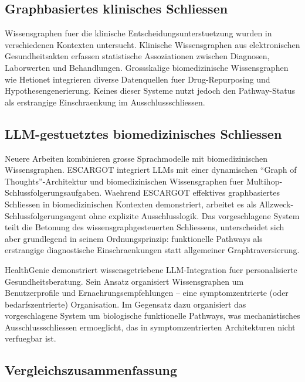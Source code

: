 \documentclass[12pt,a4paper]{article}
\begin{document}
\subsection{Graphbasiertes klinisches Schliessen}

Wissensgraphen fuer die klinische Entscheidungsunterstuetzung wurden in verschiedenen Kontexten untersucht. Klinische Wissensgraphen aus elektronischen Gesundheitsakten \citep{Rotmensch2017} erfassen statistische Assoziationen zwischen Diagnosen, Laborwerten und Behandlungen. Grossskalige biomedizinische Wissensgraphen wie Hetionet \citep{Himmelstein2017} integrieren diverse Datenquellen fuer Drug-Repurposing und Hypothesengenerierung. Keines dieser Systeme nutzt jedoch den Pathway-Status als erstrangige Einschraenkung im Ausschlussschliessen.

\subsection{LLM-gestuetztes biomedizinisches Schliessen}

Neuere Arbeiten kombinieren grosse Sprachmodelle mit biomedizinischen Wissensgraphen. ESCARGOT \citep{Matsumoto2025} integriert LLMs mit einer dynamischen "`Graph of Thoughts"'-Architektur und biomedizinischen Wissensgraphen fuer Multihop-Schlussfolgerungsaufgaben. Waehrend ESCARGOT effektives graphbasiertes Schliessen in biomedizinischen Kontexten demonstriert, arbeitet es als Allzweck-Schlussfolgerungsagent ohne explizite Ausschlusslogik. Das vorgeschlagene System teilt die Betonung des wissensgraphgesteuerten Schliessens, unterscheidet sich aber grundlegend in seinem Ordnungsprinzip: funktionelle Pathways als erstrangige diagnostische Einschraenkungen statt allgemeiner Graphtraversierung.

HealthGenie \citep{Gao2025} demonstriert wissensgetriebene LLM-Integration fuer personalisierte Gesundheitsberatung. Sein Ansatz organisiert Wissensgraphen um Benutzerprofile und Ernaehrungsempfehlungen -- eine symptomzentrierte (oder bedarfszentrierte) Organisation. Im Gegensatz dazu organisiert das vorgeschlagene System um biologische funktionelle Pathways, was mechanistisches Ausschlussschliessen ermoeglicht, das in symptomzentrierten Architekturen nicht verfuegbar ist.

\subsection{Vergleichszusammenfassung}
\end{document}
